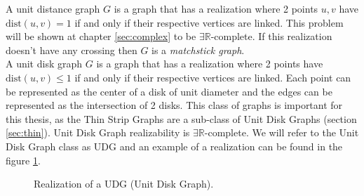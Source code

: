 A unit distance graph $G$ is a graph that has a realization where 2 points $u,v$
have $\text{dist}(u,v) = 1$ if and only if their respective vertices are linked.
This problem  will be shown at chapter \ref{sec:complex} to be $\exists
\mathbb{R}$-complete. If  this realization doesn't have any crossing then $G$ is a
\textit{matchstick graph}.\\

A unit disk graph $G$ is a graph that has a realization where 2 points have
$\text{dist}(u,v) \leq 1$ if and only if their respective vertices are linked.
Each point can be represented as the center of a disk of unit diameter and the
edges can be represented as the intersection of 2 disks. This class of graphs
is important for this thesis, as the Thin Strip Graphs are a sub-class of
Unit Disk Graphs (section \ref{sec:thin}). Unit Disk Graph realizability is
$\exists \mathbb{R}$-complete. We will refer to the Unit Disk Graph class as
UDG and an example of a realization can be found in the figure \ref{fig:udg}.

\begin{figure}
\centering

\begin{scaletikzpicturetowidth}{\textwidth}
\end{scaletikzpicturetowidth}

\caption{Realization of a UDG (Unit Disk Graph).}
\label{fig:udg}
\end{figure}
